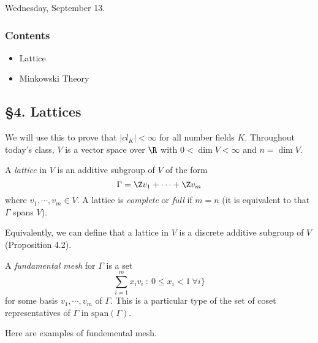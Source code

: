 Wednesday, September 13.

\subsubsection*{Contents}
\begin{itemize}
    \item Lattice
    \item Minkowski Theory
\end{itemize}

\subsection*{\S 4. Lattices}
We will use this to prove that \(|cl_K| < \infty\) for all number fields $K$. Throughout today's class, $V$ is a vector space over $\R$ with $0<\dim V < \infty$ and $n = \dim V$.

\begin{definition}
    A \textit{lattice} in $V$ is an additive subgroup of $V$ of the form \[\Gamma = \Z v_1 + \cdots + \Z v_m\]
    where $v_1, \cdots, v_m \in V$. A lattice is \textit{complete} or \textit{full} if $m = n$ (it is equivalent to that $\Gamma$ spans $V$).
\end{definition}

Equivalently, we can define that a lattice in \(V\) is a discrete additive subgroup of $V$ (Proposition 4.2).

\begin{definition}
    A \textit{fundamental mesh} for $\Gamma$ is a set 
    \[\sum_{i=1}^m x_i v_i \ : \ 0 \leq x_i <1 \ \forall i\}\]
    for some basis $v_1, \cdots, v_m$ of $\Gamma$. This is a particular type of the set of coset representatives of $\Gamma$ in $\mathrm{span} (\Gamma)$.
\end{definition}

\clearpage
Here are examples of fundemental mesh.
\begin{figure}[h!]
    \centering
{}
\end{figure}

